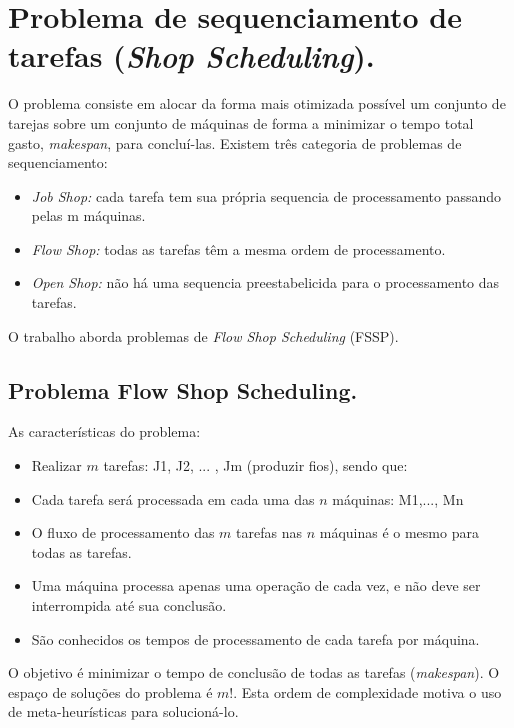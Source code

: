 \section{Problema de sequenciamento de tarefas (\textit{Shop Scheduling}).}
O problema consiste em alocar da forma mais otimizada possível um conjunto de tarejas sobre um 
conjunto de máquinas de forma a minimizar o tempo total gasto, \textit{makespan}, para concluí-las.
Existem três categoria de problemas de sequenciamento:
\begin{itemize}
\item \textit{Job Shop:} cada tarefa tem sua própria sequencia de processamento passando pelas m máquinas.
\item \textit{Flow Shop:} todas as tarefas têm a mesma ordem de processamento.
\item \textit{Open Shop:} não há uma sequencia preestabelicida para o processamento das tarefas.
\end{itemize}
O trabalho aborda problemas de \textit{Flow Shop Scheduling} (FSSP).


\subsection{Problema Flow Shop Scheduling.}
As características do problema:
\begin{itemize}
\item Realizar $m$ tarefas: J1, J2, ... , Jm (produzir fios), sendo que:
\item Cada tarefa será processada em cada uma das $n$ máquinas: M1,..., Mn
\item O fluxo de processamento das $m$ tarefas nas $n$ máquinas é o mesmo para todas as tarefas.
\item Uma máquina processa apenas uma operação de cada vez, e não deve ser interrompida até sua conclusão.
\item São conhecidos os tempos de processamento de cada tarefa por máquina.
\end{itemize}
O objetivo é minimizar o tempo de conclusão de todas as tarefas (\textit{makespan}). O espaço de soluções
do problema é $m!$. Esta ordem de complexidade motiva o uso de meta-heurísticas para solucioná-lo.


